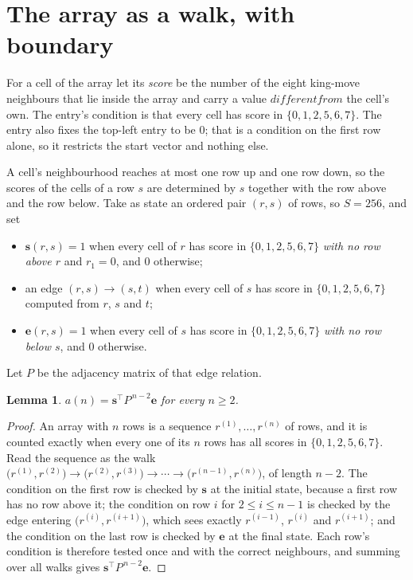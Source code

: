 \documentclass[11pt,a4paper]{article}
\theoremstyle{plain}
\newtheorem{lemma}[theorem]{Lemma}
\theoremstyle{definition}
\begin{document}
\section{The array as a walk, with boundary}

For a cell of the array let its \emph{score} be the number of the eight king-move neighbours that lie inside
the array and carry a value $different from$ the cell's own. The entry's condition is that every cell
has score in $\{0,1,2,5,6,7\}$. The entry also fixes the top-left entry to be $0$; that is a condition on the first row alone, so it restricts the start vector and nothing else.

A cell's neighbourhood reaches at most one row up and one row down, so the scores of the
cells of a row $s$ are determined by $s$ together with the row above and the row below.
Take as state an ordered pair $(r,s)$ of rows, so $S=256$, and set
\begin{itemize}
\item $\mathbf{s}(r,s)=1$ when every cell of $r$ has score in $\{0,1,2,5,6,7\}$ \emph{with no row
above $r$} and $r_1=0$, and $0$ otherwise;
\item an edge $(r,s)\to(s,t)$ when every cell of $s$ has score in $\{0,1,2,5,6,7\}$ computed from
$r$, $s$ and $t$;
\item $\mathbf{e}(r,s)=1$ when every cell of $s$ has score in $\{0,1,2,5,6,7\}$ \emph{with no row
below $s$}, and $0$ otherwise.
\end{itemize}
Let $P$ be the adjacency matrix of that edge relation.

\begin{lemma}\label{lem:walk}
$a(n)=\mathbf{s}^{\!\top}P^{\,n-2}\mathbf{e}$ for every $n\ge2$.
\end{lemma}

\begin{proof}
An array with $n$ rows is a sequence $r^{(1)},\dots,r^{(n)}$ of rows, and it is counted
exactly when every one of its $n$ rows has all scores in $\{0,1,2,5,6,7\}$. Read the sequence as the
walk $\bigl(r^{(1)},r^{(2)}\bigr)\to\bigl(r^{(2)},r^{(3)}\bigr)\to\cdots\to
\bigl(r^{(n-1)},r^{(n)}\bigr)$, of length $n-2$. The condition on the first row is
checked by $\mathbf{s}$ at the initial state, because a first row has no row above it; the
condition on row $i$ for $2\le i\le n-1$ is checked by the edge entering
$\bigl(r^{(i)},r^{(i+1)}\bigr)$, which sees exactly $r^{(i-1)}$, $r^{(i)}$ and
$r^{(i+1)}$; and the condition on the last row is checked by $\mathbf{e}$ at the final
state. Each row's condition is therefore tested once and with the correct neighbours, and
summing over all walks gives $\mathbf{s}^{\!\top}P^{\,n-2}\mathbf{e}$.
\end{proof}
\end{document}
